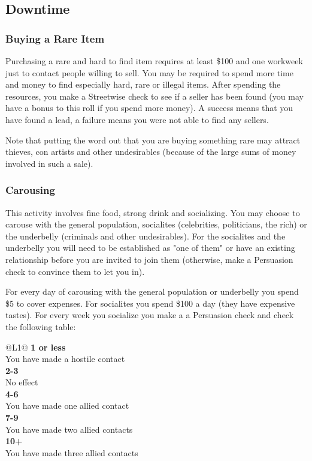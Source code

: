 \subsection{Downtime}

\subsubsection{Buying	a	Rare	Item}
Purchasing a rare and hard to find item requires at least \$100 and one workweek just to contact people willing to sell. You may be required to spend more time and money to find especially hard, rare or illegal items. After spending the resources, you make a Streetwise check to see if a seller has been found (you may have a bonus to this roll if you spend more money). A success means that you have found a lead, a failure means you were not able to find any sellers.

Note that putting the word out that you are buying something rare may attract thieves, con artists and other undesirables (because of the large sums of money involved in such a sale).

\subsubsection{Carousing}

This activity involves fine food, strong drink and socializing. You may choose to carouse with the general population, socialites (celebrities, politicians, the rich) or the underbelly (criminals and other undesirables). For the socialites and the underbelly you will need to be established as "one of them" or have an existing relationship before you are invited to join them (otherwise, make a Persuasion check to convince them to let you in).

For every day of carousing with the general population or underbelly you spend \$5 to cover expenses. For socialites you spend \$100 a day (they have expensive tastes). For every week you socialize you make a a Persuasion check and check the following table:

\begin{redtable}{\linewidth}{@{}L{1}@{}}
\textbf{1 or less}\\
You have made a hostile contact\\
\textbf{2-3}\\
No effect\\
\textbf{4-6}\\
You have made one allied contact\\
\textbf{7-9}\\
You have made two allied contacts\\
\textbf{10+}\\
You have made three allied contacts\\
\end{redtable}


